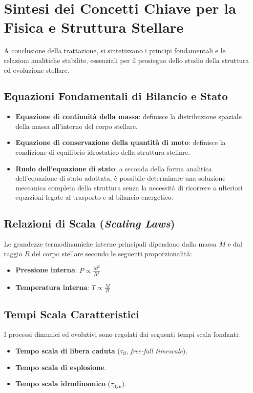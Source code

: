 \section{Sintesi dei Concetti Chiave per la Fisica e Struttura Stellare}

A conclusione della trattazione, si sintetizzano i principi fondamentali e le relazioni analitiche stabilite, essenziali per il prosieguo dello studio della struttura ed evoluzione stellare.

\subsection{Equazioni Fondamentali di Bilancio e Stato}
\begin{itemize}
\item \textbf{Equazione di continuità della massa}: definisce la distribuzione spaziale della massa all'interno del corpo stellare.
\item \textbf{Equazione di conservazione della quantità di moto}: definisce la condizione di equilibrio idrostatico della struttura stellare.
\item \textbf{Ruolo dell'equazione di stato}: a seconda della forma analitica dell'equazione di stato adottata, è possibile determinare una soluzione meccanica completa della struttura senza la necessità di ricorrere a ulteriori equazioni legate al trasporto e al bilancio energetico.
\end{itemize}

\subsection{Relazioni di Scala (\textit{Scaling Laws})}
Le grandezze termodinamiche interne principali dipendono dalla massa $M$ e dal raggio $R$ del corpo stellare secondo le seguenti proporzionalità:
\begin{itemize}
\item \textbf{Pressione interna}: $P \propto \frac{M^2}{R^4}$
\item \textbf{Temperatura interna}: $T \propto \frac{M}{R}$
\end{itemize}

\subsection{Tempi Scala Caratteristici}
I processi dinamici ed evolutivi sono regolati dai seguenti tempi scala fondanti:
\begin{itemize}
\item \textbf{Tempo scala di libera caduta} ($\tau_{\text{ff}}$, \textit{free-fall timescale}).
\item \textbf{Tempo scala di esplosione}.
\item \textbf{Tempo scala idrodinamico} ($\tau_{\text{dyn}}$).
\end{itemize}

